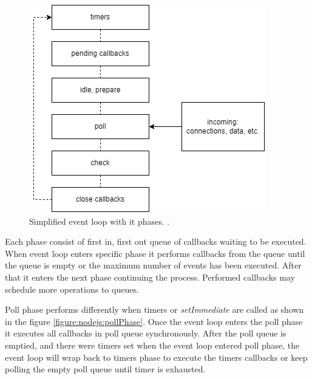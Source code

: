 \begin{figure}[htbp]
    \includegraphics[scale=0.8]{images/event_loop.png}
    \caption{Simplified event loop with it phases. \cite{node.jsEventLoop}.}
    \label{figure:nodejs:eventloop}
\end{figure}

Each phase consist of first in, first out queue of callbacks waiting to be executed.
When event loop enters specific phase it performs callbacks from the queue until the queue is empty or the maximum number of events has been executed.
After that it enters the next phase continuing the process.
Performed callbacks may schedule more operations to queues.

Poll phase performs differently when timers or \textit{setImmediate} are called as shown in the figure \ref{figure:nodejs:pollPhase}.
Once the event loop enters the poll phase it executes all callbacks in poll queue synchronously.
After the poll queue is emptied, and there were timers set when the event loop entered poll phase, the event loop will wrap back to timers phase to execute the timers callbacks or keep polling the empty poll queue until timer is exhausted.

